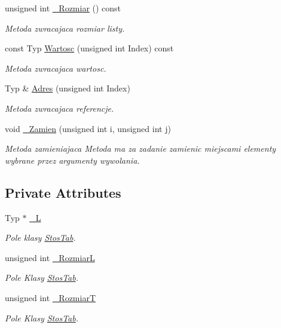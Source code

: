 \begin{DoxyCompactItemize}
unsigned int \hyperlink{class_stos_tab_a51b2da61d6c4c2085646b84395c2d3c0}{\-\_\-\-Rozmiar} () const 
\begin{DoxyCompactList}\small\item\em Metoda zwracajaca rozmiar listy. \end{DoxyCompactList}\item 
const Typ \hyperlink{class_stos_tab_aeae02936cdfdb3df20084174817b85dd}{Wartosc} (unsigned int Index) const 
\begin{DoxyCompactList}\small\item\em Metoda zwracajaca wartosc. \end{DoxyCompactList}\item 
Typ \& \hyperlink{class_stos_tab_ad19a954bb9cc9c32b42e4046c422984a}{Adres} (unsigned int Index)
\begin{DoxyCompactList}\small\item\em Metoda zwracajaca referencje. \end{DoxyCompactList}\item 
void \hyperlink{class_stos_tab_a6ce0e7f4dabae776f69fb0540ff7d8a4}{\-\_\-\-Zamien} (unsigned int i, unsigned int j)
\begin{DoxyCompactList}\small\item\em Metoda zamieniajaca Metoda ma za zadanie zamienic miejscami elementy wybrane przez argumenty wywolania. \end{DoxyCompactList}\end{DoxyCompactItemize}
\subsection*{Private Attributes}
\begin{DoxyCompactItemize}
\item 
Typ $\ast$ \hyperlink{class_stos_tab_ab6a9150fc50f2eb508a6c8026816631b}{\-\_\-\-L}
\begin{DoxyCompactList}\small\item\em Pole klasy \hyperlink{class_stos_tab}{Stos\-Tab}. \end{DoxyCompactList}\item 
unsigned int \hyperlink{class_stos_tab_abb7d52d46fdaf90dc2f3acb421bf7af6}{\-\_\-\-Rozmiar\-L}
\begin{DoxyCompactList}\small\item\em Pole Klasy \hyperlink{class_stos_tab}{Stos\-Tab}. \end{DoxyCompactList}\item 
unsigned int \hyperlink{class_stos_tab_a4db33c7f5b5f57b4d755a1beb59852dc}{\-\_\-\-Rozmiar\-T}
\begin{DoxyCompactList}\small\item\em Pole Klasy \hyperlink{class_stos_tab}{Stos\-Tab}. \end{DoxyCompactList}\end{DoxyCompactItemize}


